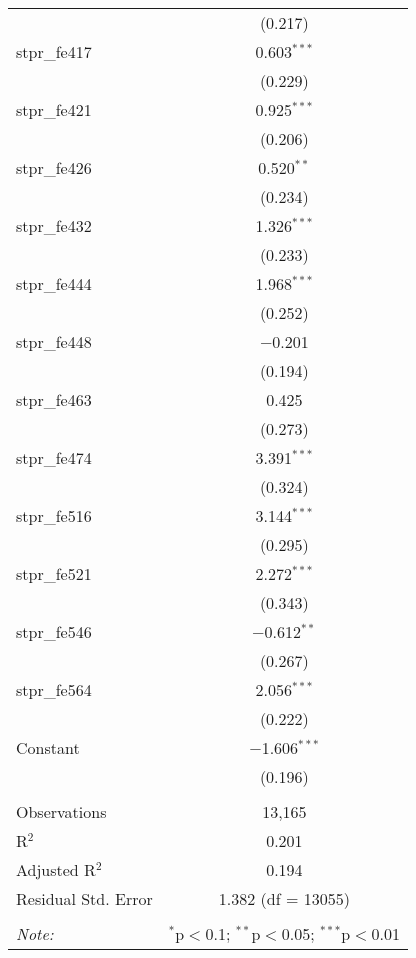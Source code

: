 \begin{table}[!htbp]
\begin{tabular}{@{\extracolsep{5pt}}lc}
  & (0.217) \\ 
  stpr\_fe417 & 0.603$^{***}$ \\ 
  & (0.229) \\ 
  stpr\_fe421 & 0.925$^{***}$ \\ 
  & (0.206) \\ 
  stpr\_fe426 & 0.520$^{**}$ \\ 
  & (0.234) \\ 
  stpr\_fe432 & 1.326$^{***}$ \\ 
  & (0.233) \\ 
  stpr\_fe444 & 1.968$^{***}$ \\ 
  & (0.252) \\ 
  stpr\_fe448 & $-$0.201 \\ 
  & (0.194) \\ 
  stpr\_fe463 & 0.425 \\ 
  & (0.273) \\ 
  stpr\_fe474 & 3.391$^{***}$ \\ 
  & (0.324) \\ 
  stpr\_fe516 & 3.144$^{***}$ \\ 
  & (0.295) \\ 
  stpr\_fe521 & 2.272$^{***}$ \\ 
  & (0.343) \\ 
  stpr\_fe546 & $-$0.612$^{**}$ \\ 
  & (0.267) \\ 
  stpr\_fe564 & 2.056$^{***}$ \\ 
  & (0.222) \\ 
  Constant & $-$1.606$^{***}$ \\ 
  & (0.196) \\ 
 \hline \\[-1.8ex] 
Observations & 13,165 \\ 
R$^{2}$ & 0.201 \\ 
Adjusted R$^{2}$ & 0.194 \\ 
Residual Std. Error & 1.382 (df = 13055) \\ 
\hline 
\hline \\[-1.8ex] 
\textit{Note:}  & \multicolumn{1}{r}{$^{*}$p$<$0.1; $^{**}$p$<$0.05; $^{***}$p$<$0.01} \\ 
\end{tabular} 
\end{table} 
